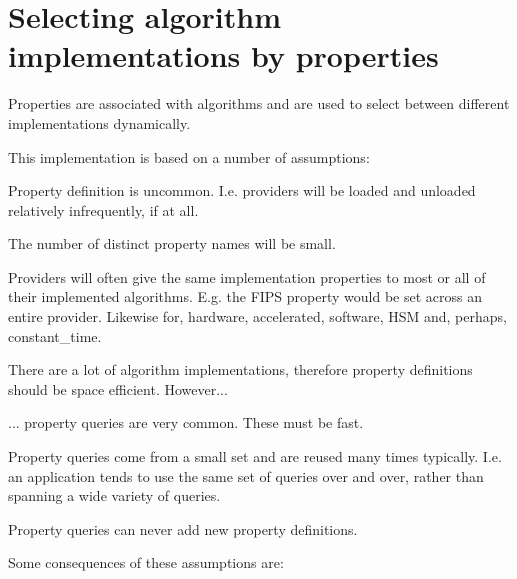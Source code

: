 \chapter{Selecting algorithm implementations by properties}
\hypertarget{md__c_1_2_users_2namph_2_downloads_2openssl_2openssl-3_82_81_2crypto_2property_2_r_e_a_d_m_e}{}\label{md__c_1_2_users_2namph_2_downloads_2openssl_2openssl-3_82_81_2crypto_2property_2_r_e_a_d_m_e}
Properties are associated with algorithms and are used to select between different implementations dynamically.

This implementation is based on a number of assumptions\+:


\begin{DoxyItemize}
\item Property definition is uncommon. I.\+e. providers will be loaded and unloaded relatively infrequently, if at all.
\item The number of distinct property names will be small.
\item Providers will often give the same implementation properties to most or all of their implemented algorithms. E.\+g. the FIPS property would be set across an entire provider. Likewise for, hardware, accelerated, software, HSM and, perhaps, constant\+\_\+time.
\item There are a lot of algorithm implementations, therefore property definitions should be space efficient. However...
\item ... property queries are very common. These must be fast.
\item Property queries come from a small set and are reused many times typically. I.\+e. an application tends to use the same set of queries over and over, rather than spanning a wide variety of queries.
\item Property queries can never add new property definitions.
\end{DoxyItemize}

Some consequences of these assumptions are\+:



